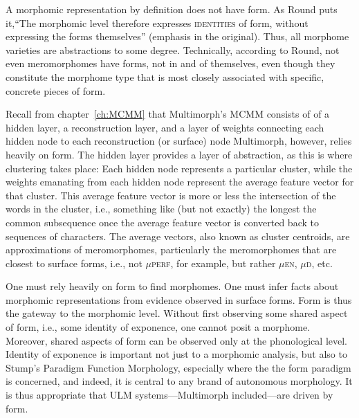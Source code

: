A morphomic representation by definition does not have form.
As Round puts it,``The morphomic level 
therefore expresses \textsc{identities} of form, without 
expressing the forms themselves'' \citep[][pp.220-221]{round:2011} (emphasis in the original).
Thus, all morphome varieties are abstractions to some degree. 
Technically, according to Round, not even 
meromorphomes have forms, not in and 
of themselves, even though they constitute the 
morphome type that is most closely associated with specific, concrete pieces of form. 

Recall from chapter~\ref{ch:MCMM} that Multimorph's MCMM consists of
of a hidden layer, a reconstruction layer, and a layer of
weights connecting each hidden node to each reconstruction (or surface) node
Multimorph, however, relies heavily on form. The hidden 
layer provides a layer of abstraction, as this is where 
clustering takes place: Each hidden node represents 
a particular cluster, while the weights emanating from
each hidden node represent the average feature vector for that
cluster. This average feature vector is more or less the intersection
of the words in the cluster, i.e., something like (but not exactly) 
the longest the common subsequence once the average feature vector
is converted back to sequences of characters. The average vectors, also known as
cluster centroids, are approximations of meromorphomes, 
particularly the meromorphomes
that are closest to surface forms, i.e., not $\mu${\textsc{perf}}, 
for example, but rather $\mu${\textsc{en}},
$\mu${\textsc{d}}, etc.

One must rely heavily on form to find morphomes. One 
must infer facts about morphomic representations
from evidence observed in surface forms. Form is thus the 
gateway to the morphomic level. Without first observing 
some shared aspect of form, i.e., some identity of exponence, 
one cannot posit a morphome. Moreover, shared aspects of form 
can be observed only at the phonological level.
Identity of exponence is important not just to a morphomic analysis,
but also to Stump's Paradigm Function Morphology, especially where the 
the form paradigm is concerned, and indeed, it is central to any 
brand of autonomous morphology. It is thus appropriate that ULM 
systems---Multimorph included---are driven by form.

